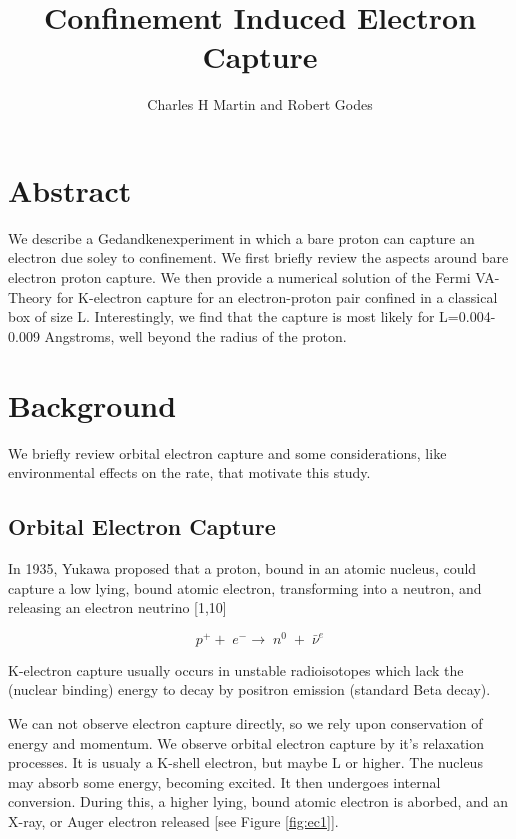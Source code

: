 \documentclass[11pt]{amsart}
\title{Confinement Induced Electron Capture}
\author{Charles H Martin and Robert Godes}
\begin{document}
\maketitle
\section{Abstract}

We describe a Gedandkenexperiment in which a bare proton can capture an electron due soley to confinement. We first briefly review the aspects around bare electron proton capture.  We then provide a numerical solution of the Fermi VA-Theory for K-electron capture for an electron-proton pair confined in a classical box of size L. Interestingly, we find that the capture is most likely for L=0.004-0.009 Angstroms, well beyond the radius of the proton. 

\section{Background}


We briefly review orbital electron capture and some considerations, like environmental effects on the rate, that motivate this study.

\subsection{Orbital Electron Capture}
In 1935, Yukawa proposed that a proton, bound in an atomic nucleus,  could capture a low lying, bound atomic electron, transforming into a neutron, and releasing an electron neutrino [1,10]


$$p^{+}+\;e^{-}\rightarrow\;n^{0}\;+\;\bar{\nu}^{e}$$

K-electron capture usually occurs in unstable radioisotopes which lack the (nuclear binding) energy to decay by positron emission (standard Beta decay).   

We can not observe electron capture directly, so we rely upon conservation of energy and momentum. We observe orbital electron capture by it's relaxation processes.  It is usualy a K-shell electron, but maybe L or higher.  The nucleus may absorb some energy, becoming excited.  It then undergoes internal conversion.  During this, a higher lying, bound atomic electron is aborbed, and an X-ray, or Auger electron released [see Figure \ref{fig:ec1}].
\end{document}
